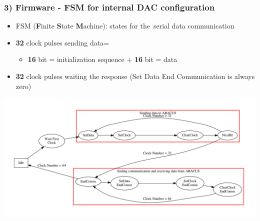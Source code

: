 \documentclass[aspectratio=169]{beamer}
\begin{document}
	\begin{frame}%
		\frametitle{3) Firmware - FSM for internal DAC configuration}
		\begin{itemize}
			\item FSM (\textbf{F}inite \textbf{S}tate \textbf{M}achine): states for the~serial data communication
			\item \textbf{32} clock pulses sending data=
			\begin{itemize}
				\item \textbf{16} bit = initialization sequence + \textbf{16} bit = data
			\end{itemize}
			\item \textbf{32} clock pulses waiting the response (Set Data End Communication is always zero)
		\end{itemize}
		\begin{center}
			\includegraphics[width=0.85 \textwidth]{IMG2/InternalDACsFSM.pdf}
		\end{center}
	\end{frame}


\end{document}
